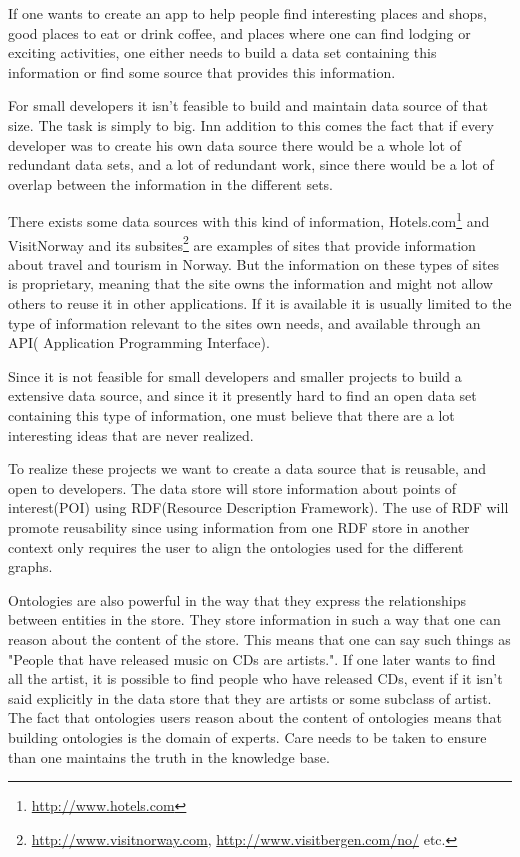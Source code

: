 If one wants to create an app to help people find interesting places and shops, good places to eat or drink coffee, and places where one can find lodging or exciting activities, 
one either needs to build a data set containing this information or find some source that provides this information.

For small developers it isn't feasible to build and maintain data source of that size. The task is simply to big. 
Inn addition to this comes the fact that if every developer was to create his own data source there would be a whole lot of redundant data sets, and a lot of redundant work, since there would be a lot of overlap between the information in the different sets.

There exists some data sources with this kind of information, Hotels.com\footnote{\url{http://www.hotels.com}} and VisitNorway and its subsites\footnote{\url{http://www.visitnorway.com}, \url{http://www.visitbergen.com/no/} etc. } are examples of sites that provide information about travel and tourism in Norway.
But the information on these types of sites is proprietary, meaning that the site owns the information and might not allow others to reuse it in other applications. If it is available it is usually limited to the type of information relevant to the sites own needs, and available through an API( Application Programming Interface).

Since it is not feasible for small developers and smaller projects to build a extensive data source, and since it it presently hard to find an open data set containing this type of information,  one must believe that there are a lot interesting ideas that are never realized.

To realize these projects we want to create a data source that is reusable, and open to developers. The data store will store information about points of interest(POI) using RDF(Resource Description Framework). 
The use of RDF will promote reusability since using information from one RDF store in another context only requires the user to align the ontologies used for the different graphs. 

Ontologies are also powerful in the way that they express the relationships between entities in the store. They store information in such a way that one can reason about the content of the store. 
This means that one can say such things as "People that have released music on CDs are artists.". If one later wants to find all the artist, it is possible to find people who have released CDs, event if it isn't said explicitly in the data store that they are artists or some subclass of artist.
The fact that ontologies users reason about the content of ontologies means that building ontologies is the domain of experts. Care needs to be taken to ensure than one maintains the truth in the knowledge base.

